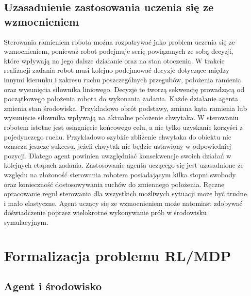\documentclass[12pt]{article}
\begin{document}
\subsection{Uzasadnienie zastosowania uczenia się ze wzmocnieniem}

Sterowania ramieniem robota  można rozpatrywać jako problem uczenia się ze wzmocnieniem, ponieważ robot podejmuje serię powiązanych ze sobą decyzji, które wpływają na jego dalsze działanie oraz na stan otoczenia. 
W trakcie realizacji zadania robot musi kolejno podejmować decyzje dotyczące między innymi kierunku i zakresu ruchu poszczególnych przegubów, położenia ramienia oraz wysunięcia siłownika liniowego.
Decyzje te tworzą sekwencję prowadzącą od początkowego położenia robota do wykonania zadania.
Każde działanie agenta zmienia stan środowiska. Przykładowo obrót podstawy, zmiana kąta ramienia lub wysunięcie siłownika wpływają na aktualne położenie chwytaka.
W sterowaniu robotem istotne jest osiągnięcie końcowego celu, a nie tylko uzyskanie korzyści z pojedynczego ruchu. Przykładowo szybkie zbliżenie chwytaka do obiektu nie oznacza jeszcze sukcesu, jeżeli chwytak nie będzie ustawiony w odpowiedniej pozycji.
Dlatego agent powinien uwzględniać konsekwencje swoich działań w kolejnych etapach zadania.
Zastosowanie agenta uczącego się jest uzasadnione ze względu na złożoność sterowania robotem posiadającym kilka stopni swobody oraz konieczność dostosowywania ruchów do zmiennego położenia.
Ręczne opracowanie reguł sterowania dla wszystkich możliwych sytuacji może być trudne i mało elastyczne. Agent uczący się ze wzmocnieniem może natomiast zdobywać doświadczenie poprzez wielokrotne wykonywanie prób w środowisku symulacyjnym.

\section{Formalizacja problemu RL/MDP}

\subsection{Agent i środowisko}
\end{document}
